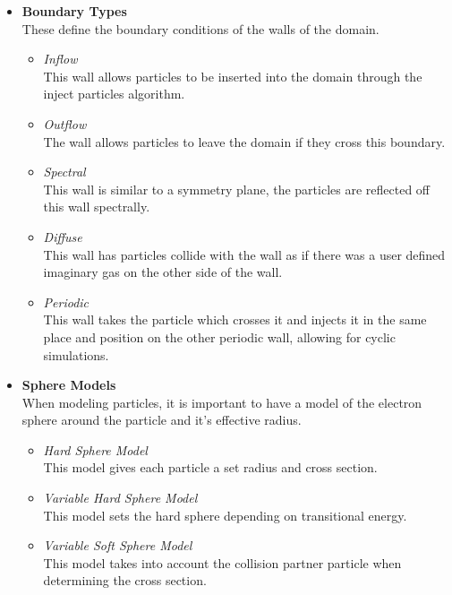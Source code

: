 \begin{itemize}
    \item \textbf{Boundary Types} \\
    These define the boundary conditions of the walls of the domain.
    \begin{itemize}
        \item \textit{Inflow} \\
        This wall allows particles to be inserted into the domain through the inject particles algorithm.
        \item \textit{Outflow} \\
        The wall allows particles to leave the domain if they cross this boundary.
        \item \textit{Spectral}\\
        This wall is similar to a symmetry plane, the particles are reflected off this wall spectrally.
        \item \textit{Diffuse}\\
        This wall has particles collide with the wall as if there was a user defined imaginary gas on the other side of the wall.
        \item \textit{Periodic} \\
        This wall takes the particle which crosses it and injects it in the same place and position on the other periodic wall, allowing for cyclic simulations.
    \end{itemize}
    
    \item \textbf{Sphere Models}\\
    When modeling particles, it is important to have a model of the electron sphere around the particle and it's effective radius.
    \begin{itemize}
        \item \textit{Hard Sphere Model}\\
        This model gives each particle a set radius and cross section.
        \item \textit{Variable Hard Sphere Model}\\
        This model sets the hard sphere depending on transitional energy.
        \item \textit{Variable Soft Sphere Model}\\
        This model takes into account the collision partner particle when determining the cross section.
    \end{itemize}
    

\end{itemize}
